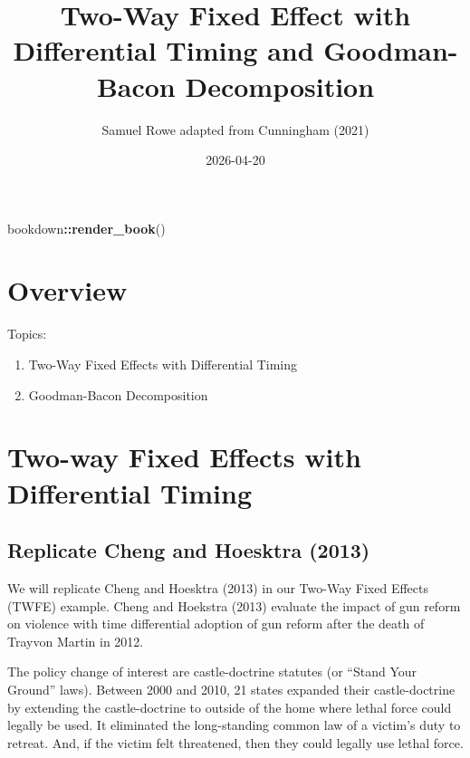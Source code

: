 \documentclass[
]{book}
\title{Two-Way Fixed Effect with Differential Timing and Goodman-Bacon Decomposition}
\author{Samuel Rowe adapted from Cunningham (2021)}
\date{2026-04-20}
\newenvironment{Shaded}{\begin{snugshade}}{\end{snugshade}}
\newcommand{\FunctionTok}[1]{\textcolor[rgb]{0.13,0.29,0.53}{\textbf{#1}}}
\newcommand{\NormalTok}[1]{#1}
\newcommand{\SpecialCharTok}[1]{\textcolor[rgb]{0.81,0.36,0.00}{\textbf{#1}}}
\providecommand{\tightlist}{%
  \setlength{\itemsep}{0pt}\setlength{\parskip}{0pt}}
\begin{document}
\maketitle

{
\setcounter{tocdepth}{1}
\tableofcontents
}
\begin{Shaded}
\begin{Highlighting}[]
\NormalTok{bookdown}\SpecialCharTok{::}\FunctionTok{render\_book}\NormalTok{()}
\end{Highlighting}
\end{Shaded}

\chapter*{Overview}\label{overview}

Topics:

\begin{enumerate}
\def\labelenumi{\arabic{enumi}.}
\tightlist
\item
  Two-Way Fixed Effects with Differential Timing
\item
  Goodman-Bacon Decomposition
\end{enumerate}

\chapter{Two-way Fixed Effects with Differential Timing}\label{two-way-fixed-effects-with-differential-timing}

\section{Replicate Cheng and Hoesktra (2013)}\label{replicate-cheng-and-hoesktra-2013}

We will replicate Cheng and Hoesktra (2013) in our Two-Way Fixed Effects (TWFE) example. Cheng and Hoekstra (2013) evaluate the impact of gun reform on violence with time differential adoption of gun reform after the death of Trayvon Martin in 2012.

The policy change of interest are castle-doctrine statutes (or ``Stand Your Ground'' laws). Between 2000 and 2010, 21 states expanded their castle-doctrine by extending the castle-doctrine to outside of the home where lethal force could legally be used. It eliminated the long-standing common law of a victim's duty to retreat. And, if the victim felt threatened, then they could legally use lethal force.
\end{document}
